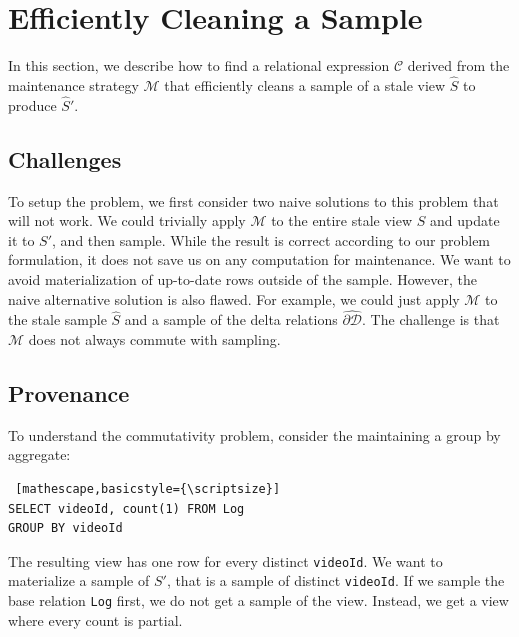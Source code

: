 \section{Efficiently Cleaning a Sample} \label{sampling}
In this section, we describe how to find a relational expression $\mathcal{C}$ derived from the maintenance strategy $\mathcal{M}$ that
efficiently cleans a sample of a stale view $\widehat{S}$ to produce $\widehat{S}'$.

\subsection{Challenges}
To setup the problem, we first consider two naive solutions to this problem that will not work. 
We could trivially apply $\mathcal{M}$ to the entire stale view $S$ and update it to $S'$, and then sample.
While the result is correct according to our problem formulation, it does not save us on any computation for maintenance.
We want to avoid materialization of up-to-date rows outside of the sample. 
However, the naive alternative solution is also flawed. 
For example, we could just apply $\mathcal{M}$ to the stale sample $\widehat{S}$ and a sample of the delta relations $\widehat{\partial \mathcal{D}}$. 
The challenge is that $\mathcal{M}$ does not always commute with sampling. 

\subsection{Provenance}
\label{lin}
To understand the commutativity problem, consider the maintaining a group by aggregate:
\begin{lstlisting} [mathescape,basicstyle={\scriptsize}]
SELECT videoId, count(1) FROM Log
GROUP BY videoId
\end{lstlisting}
The resulting view has one row for every distinct \texttt{videoId}.
We want to materialize a sample of $S'$, that is a sample of distinct \texttt{videoId}.
If we sample the base relation \texttt{Log} first, we do not get a sample of the view.
Instead, we get a view where every count is partial.

